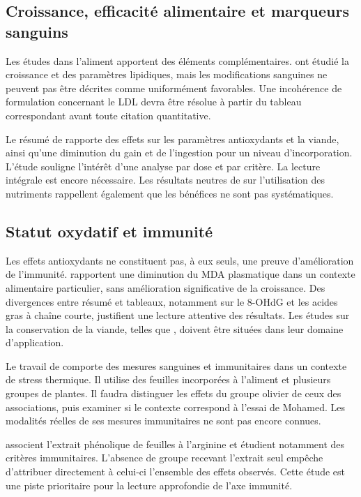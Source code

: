 \documentclass[11pt,a4paper]{article}
\begin{document}
\subsection{Croissance, efficacité alimentaire et marqueurs sanguins}

Les études dans l'aliment apportent des éléments complémentaires. \citet{Erener2020} ont étudié la croissance et des paramètres lipidiques, mais les modifications sanguines ne peuvent pas être décrites comme uniformément favorables. Une incohérence de formulation concernant le LDL devra être résolue à partir du tableau correspondant avant toute citation quantitative.

Le résumé de \citet{Xie2022} rapporte des effets sur les paramètres antioxydants et la viande, ainsi qu'une diminution du gain et de l'ingestion pour un niveau d'incorporation. L'étude souligne l'intérêt d'une analyse par dose et par critère. La lecture intégrale est encore nécessaire. Les résultats neutres de \citet{Leskovec2018} sur l'utilisation des nutriments rappellent également que les bénéfices ne sont pas systématiques.

\subsection{Statut oxydatif et immunité}

Les effets antioxydants ne constituent pas, à eux seuls, une preuve d'amélioration de l'immunité. \citet{Pirman2021} rapportent une diminution du MDA plasmatique dans un contexte alimentaire particulier, sans amélioration significative de la croissance. Des divergences entre résumé et tableaux, notamment sur le 8-OHdG et les acides gras à chaîne courte, justifient une lecture attentive des résultats. Les études sur la conservation de la viande, telles que \citet{Sarica2018}, doivent être situées dans leur domaine d'application.

Le travail de \citet{Mahasneh2024} comporte des mesures sanguines et immunitaires dans un contexte de stress thermique. Il utilise des feuilles incorporées à l'aliment et plusieurs groupes de plantes. Il faudra distinguer les effets du groupe olivier de ceux des associations, puis examiner si le contexte correspond à l'essai de Mohamed. Les modalités réelles de ses mesures immunitaires ne sont pas encore connues.

\citet{Alfifi2025} associent l'extrait phénolique de feuilles à l'arginine et étudient notamment des critères immunitaires. L'absence de groupe recevant l'extrait seul empêche d'attribuer directement à celui-ci l'ensemble des effets observés. Cette étude est une piste prioritaire pour la lecture approfondie de l'axe immunité.
\end{document}
